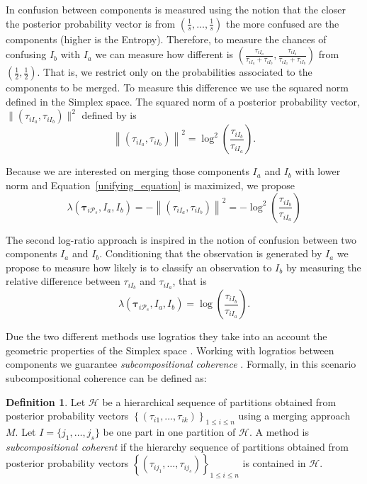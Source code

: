 \documentclass[submit]{smj}
\theoremstyle{definition}
\newtheorem{defn}{Definition}[section]
\newcommand{\m}[1]{\boldsymbol{#1}}
\begin{document}
In \cite{baudry2010combining} confusion between components is measured using the notion that the closer the posterior probability vector is from $(\frac{1}{s}, \dots, \frac{1}{s})$ the more confused are the components (higher is the Entropy). Therefore, to measure the chances of confusing $I_b$ with $I_a$ we can measure how different is $(\frac{\tau_{i I_a}}{\tau_{i I_a} +\tau_{i I_b}}, \frac{\tau_{i I_b}}{\tau_{i I_a} + \tau_{i I_b}})$ from $(\frac{1}{2}, \frac{1}{2})$. That is, we restrict only on the probabilities associated to the components to be merged. To measure this difference we use the squared norm defined in the Simplex space. The squared norm of a posterior probability vector, $\| (\tau_{iI_a}, \tau_{iI_b}) \|^2$  defined by \cite{aitchison2002simplicial} is 
\[
\left\| (\tau_{iI_a}, \tau_{iI_b}) \right\|^2 = \log^2 \left(\frac{ \tau_{iI_b} }{ \tau_{iI_a} }\right).
\]

Because we are interested on merging those components $I_a$ and $I_b$ with lower norm and Equation~\ref{unifying_equation} is maximized, we propose
\[
\lambda(\m\tau_{i \mathcal{P}_s},  I_a,  I_b) = -\left\| (\tau_{iI_a}, \tau_{iI_b}) \right\|^2 = -\log^2 \left(\frac{ \tau_{iI_b} }{ \tau_{iI_a} }\right)
\]


The second log-ratio approach is inspired in the notion of confusion \citep{hennig2010methods} between two components $I_a$ and $I_b$. Conditioning that the observation is generated by $I_a$ we propose to measure how likely is to classify an observation to $I_b$ by measuring the relative difference between $\tau_{i I_b}$ and $\tau_{i I_a}$, that is 
\[
\lambda(\m\tau_{i \mathcal{P}_s},  I_a,  I_b) = \log \left(\frac{ \tau_{iI_b} }{ \tau_{iI_a} }\right).
\]


Due the two different methods use logratios they take into an account the geometric properties of the Simplex space \citep{aitchison2002simplicial}.  Working with logratios between components we guarantee \emph{subcompositional coherence}  \citep{aitchison1986statistical}. Formally, in this scenario subcompositional coherence can be defined as:

\begin{defn}
Let $\mathcal{H}$ be a hierarchical sequence of partitions obtained from posterior probability vectors $\left\{ \left(\tau_{i1}, \dots, \tau_{ik} \right)\right\}_{1\leq i \leq n}$ using a merging approach $M$. Let $I = \{j_1, \dots, j_s\}$ be one part in one partition of $\mathcal{H}$. A method is \emph{subcompositional coherent} if the hierarchy sequence of partitions obtained  from posterior probability vectors $\left\{ \left(\tau_{ij_1}, \dots, \tau_{ij_s} \right)\right\}_{1\leq i \leq n}$ is contained in $\mathcal{H}$.
\end{defn}
\end{document}
